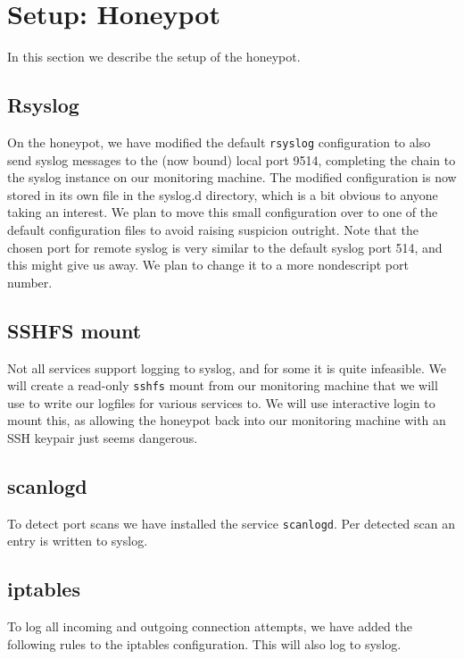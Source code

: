 \documentclass[11pt]{article} %
\begin{document}


\section{Setup: Honeypot}

In this section we describe the setup of the honeypot.

\subsection{Rsyslog}
On the honeypot, we have modified the default \verb|rsyslog| configuration to also send syslog messages to the (now bound) local port 9514, completing the chain to the syslog instance on our monitoring machine.
The modified configuration is now stored in its own file in the syslog.d directory, which is a bit obvious to anyone taking an interest.
We plan to move this small configuration over to one of the default configuration files to avoid raising suspicion outright.
Note that the chosen port for remote syslog is very similar to the default syslog port 514, and this might give us away.
We plan to change it to a more nondescript port number.

\subsection{SSHFS mount}
Not all services support logging to syslog, and for some it is quite infeasible.
We will create a read-only \verb|sshfs| mount from our monitoring machine that we will use to write our logfiles for various services to.
We will use interactive login to mount this, as allowing the honeypot back into our monitoring machine with an SSH keypair just seems dangerous.

\subsection{scanlogd}
To detect port scans we have installed the service \verb|scanlogd|.
Per detected scan an entry is written to syslog.

\subsection{iptables}
To log all incoming and outgoing connection attempts, we have added the following rules to the iptables configuration. 
This will also log to syslog.
\end{document}
